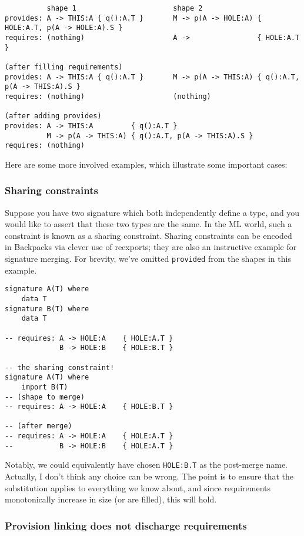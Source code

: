 \documentclass{article}
\newcommand{\Red}[1]{{\color{red} #1}}
\begin{document}
\begin{verbatim}
          shape 1                       shape 2
provides: A -> THIS:A { q():A.T }       M -> p(A -> HOLE:A) { HOLE:A.T, p(A -> HOLE:A).S }
requires: (nothing)                     A ->                { HOLE:A.T }

(after filling requirements)
provides: A -> THIS:A { q():A.T }       M -> p(A -> THIS:A) { q():A.T, p(A -> THIS:A).S }
requires: (nothing)                     (nothing)

(after adding provides)
provides: A -> THIS:A         { q():A.T }
          M -> p(A -> THIS:A) { q():A.T, p(A -> THIS:A).S }
requires: (nothing)
\end{verbatim}

Here are some more involved examples, which illustrate some important
cases:

\subsubsection{Sharing constraints}

Suppose you have two signature which both independently define a type,
and you would like to assert that these two types are the same.  In the
ML world, such a constraint is known as a sharing constraint.  Sharing
constraints can be encoded in Backpacks via clever use of reexports;
they are also an instructive example for signature merging.
For brevity, we've omitted \verb|provided| from the shapes in this example.

\begin{verbatim}
signature A(T) where
    data T
signature B(T) where
    data T

-- requires: A -> HOLE:A  	{ HOLE:A.T }
             B -> HOLE:B	{ HOLE:B.T }

-- the sharing constraint!
signature A(T) where
    import B(T)
-- (shape to merge)
-- requires: A -> HOLE:A	{ HOLE:B.T }

-- (after merge)
-- requires: A -> HOLE:A	{ HOLE:A.T }
--			 B -> HOLE:B	{ HOLE:A.T }
\end{verbatim}

Notably, we could equivalently have chosen \verb|HOLE:B.T| as the post-merge
name.  \Red{Actually, I don't think any choice can be wrong. The point is to
ensure that the substitution applies to everything we know about, and since requirements
monotonically increase in size (or are filled), this will hold.}

\subsubsection{Provision linking does not discharge requirements}
\end{document}
